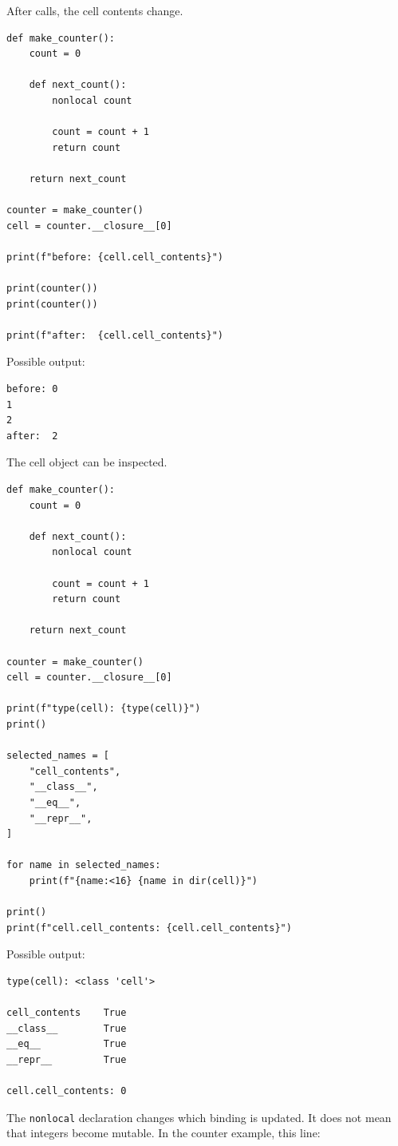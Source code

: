 After calls, the cell contents change.

\begin{verbatim}
def make_counter():
    count = 0

    def next_count():
        nonlocal count

        count = count + 1
        return count

    return next_count

counter = make_counter()
cell = counter.__closure__[0]

print(f"before: {cell.cell_contents}")

print(counter())
print(counter())

print(f"after:  {cell.cell_contents}")
\end{verbatim}

Possible output:

\begin{verbatim}
before: 0
1
2
after:  2
\end{verbatim}

The cell object can be inspected.

\begin{verbatim}
def make_counter():
    count = 0

    def next_count():
        nonlocal count

        count = count + 1
        return count

    return next_count

counter = make_counter()
cell = counter.__closure__[0]

print(f"type(cell): {type(cell)}")
print()

selected_names = [
    "cell_contents",
    "__class__",
    "__eq__",
    "__repr__",
]

for name in selected_names:
    print(f"{name:<16} {name in dir(cell)}")

print()
print(f"cell.cell_contents: {cell.cell_contents}")
\end{verbatim}

Possible output:

\begin{verbatim}
type(cell): <class 'cell'>

cell_contents    True
__class__        True
__eq__           True
__repr__         True

cell.cell_contents: 0
\end{verbatim}

The \texttt{nonlocal} declaration changes which binding is updated. It does not mean that integers become mutable. In the counter example, this line:

